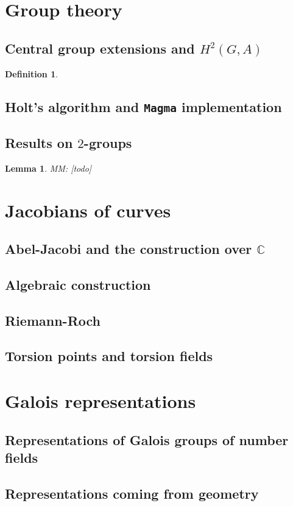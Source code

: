 \documentclass{dcthesis}
\newcommand{\CC}{\mathbb C}
\newcommand{\mm}[1]{{\color{blue} \sf MM: [#1]}}
\newtheorem{lemma}[prop]{Lemma}
\theoremstyle{definition}
\newtheorem{definition}[prop]{Definition}
\theoremstyle{remark}
\numberwithin{equation}{section}
\numberwithin{figure}{section}
\begin{document}
{  \section{Group theory}{
    \subsection{Central group extensions and $H^2(G,A)$}{
      \begin{definition}
        \label{def:isoextentions}
      \end{definition}
    }
    \subsection{Holt's algorithm and \texttt{Magma} implementation}{
      \label{subsec:holtsalgorithm}
    }
    \subsection{Results on $2$-groups}{
      \begin{lemma}\label{lem:2groupfiltration}
        \mm{todo}
      \end{lemma}
    }
  }
  \section{Jacobians of curves}{
    \subsection{Abel-Jacobi and the construction over $\CC$}{
    }
    \subsection{Algebraic construction}{
    }
    \subsection{Riemann-Roch}{
    }
    \subsection{Torsion points and torsion fields}{
    }
  }
  \section{Galois representations}{
    \subsection{Representations of Galois groups of number fields}{
    }
    \subsection{Representations coming from geometry}{
    }
  }
}
\end{document}
